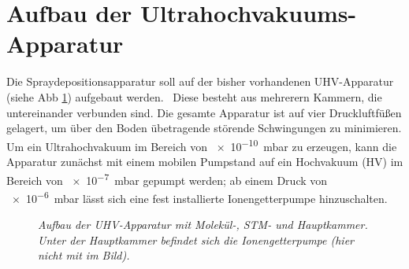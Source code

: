 \section{Aufbau der Ultrahochvakuums-Apparatur}\label{kapaufbau}

Die Spraydepositionsapparatur soll auf der bisher vorhandenen UHV-Apparatur (siehe Abb
\ref{uhvaufbau}) aufgebaut werden.~%
 Diese besteht aus mehrerern Kammern, die untereinander verbunden sind. Die gesamte Apparatur ist
auf vier Druckluftfüßen gelagert, um über den Boden übetragende störende Schwingungen zu minimieren. Um ein
Ultrahochvakuum im Bereich von \SI{e-10}{mbar} zu erzeugen, kann die Apparatur zunächst mit einem
mobilen Pumpstand %
auf ein Hochvakuum (HV) im Bereich von
\SI{e-7}{mbar} gepumpt werden; ab einem Druck von \SI{e-6}{mbar} lässt sich eine fest installierte
Ionengetterpumpe hinzuschalten.

\begin{figure}[H]
\centering
\sffamily

\caption{\textit{Aufbau der UHV-Apparatur mit Molekül-, STM- und Hauptkammer. Unter der
Hauptkammer befindet sich die Ionengetterpumpe (hier nicht mit im Bild).}}
\label{uhvaufbau}
\end{figure}

